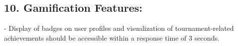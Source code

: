\subsection*{10. Gamification Features:}
    - Display of badges on user profiles and visualization of tournament-related achievements should be accessible within a response time of 3 seconds.
%
%
%





